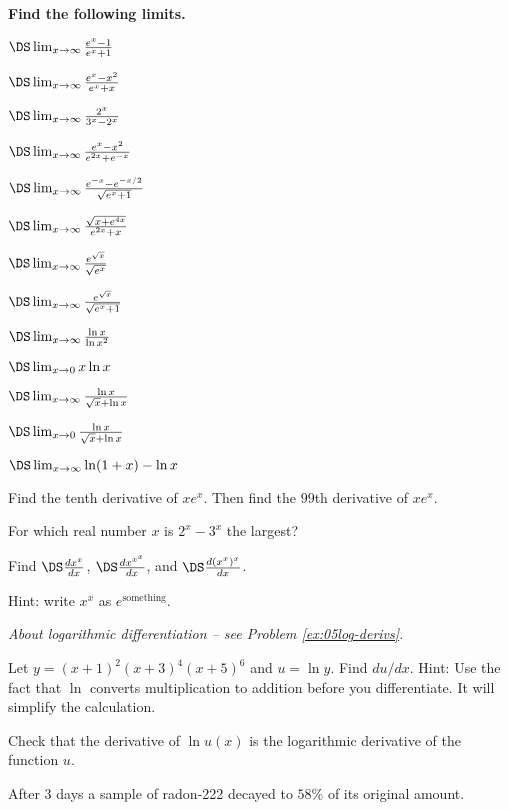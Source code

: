 \begin{multicols}{2}
\bigskip
\textbf{Find the following limits.}
\begin{multicols}{2}
\problem  $\DS\lim_{x\to\infty}\frac{e^x-1}{e^x+1} $

\problem  $\DS\lim_{x \to\infty}\frac{e^x-x^2}{e^x+x} $

\problem  $\DS\lim_{x\to\infty}\frac{2^x}{3^x-2^x} $

\problem  $\DS\lim_{x \to\infty}\frac{e^x-x^2}{e^{2x}+e^{-x}} $

\problem  $\DS\lim_{x \to\infty}\frac{e^{-x}-e^{-x/2}}{\sqrt{e^x+1}} $

\problem  $\DS\lim_{x \to\infty}\frac{\sqrt{x+e^{4x}}}{e^{2x}+x} $

\problem  $\DS\lim_{x \to\infty}\frac{e^{\sqrt x}}{\sqrt{e^x}} $

\problem  $\DS\lim_{x \to \infty} \frac{e^{\sqrt{x}}} {\sqrt{e^x+1}}$

\problem  $\DS\lim_{x \to\infty}\frac{\ln x}{\ln x^2} $

\problem  $\DS\lim_{x \to 0} x\ln x$

\problem  $\DS\lim_{x\to\infty}\frac{\ln x}{\sqrt x+\ln x} $

\problem  $\DS\lim_{x\to 0}\frac{\ln x}{\sqrt x+\ln x} $

\end{multicols}
\problem  $\DS\lim_{x \to\infty}\ln (1+x) - \ln x$


\problem  Find the tenth derivative of $xe^x$.  Then find the $99$th
derivative of $xe^{x}$. 

\problem For which real number $x$ is $2^x- 3^x$ the largest?


\problem Find $\DS\frac{dx^x}{dx} $, $\DS\frac{d x^{x^x}}{dx}$, and
$\DS\frac{d(x^x)^x}{dx} $.

\null\hfill Hint: write $x^x$ as $e^{\text{something}}$.


\problem \groupproblem \textit{About logarithmic differentiation --
see Problem \ref{ex:05log-derivs}.}

\subprob  Let $y=(x+1)^2(x+3)^4(x+5)^6$ and $u=\ln y$.  Find $du/dx$. Hint:
Use the fact that $\ln$ converts multiplication to addition before you
differentiate.  It will simplify the calculation.

\subprob  Check that the derivative of $\ln u(x)$ is the logarithmic
derivative of the function $u$.



\problem After $3$ days a sample of radon-222 decayed to $58\%$ of its original
amount. 


\end{multicols}
